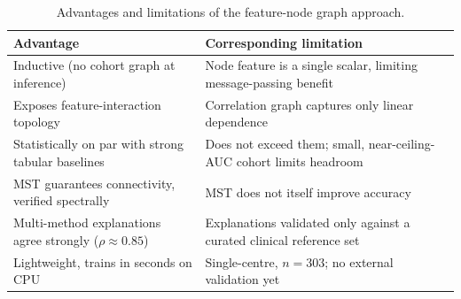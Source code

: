 \begin{table}[t]
\centering
\caption{Advantages and limitations of the feature-node graph approach.}
\label{tab:advlim}
\footnotesize
\begin{tabular}{p{4cm}p{4cm}}
\toprule
Advantage & Corresponding limitation \\
\midrule
Inductive (no cohort graph at inference) & Node feature is a single scalar, limiting message-passing benefit \\
Exposes feature-interaction topology & Correlation graph captures only linear dependence \\
Statistically on par with strong tabular baselines & Does not exceed them; small, near-ceiling-AUC cohort limits headroom \\
MST guarantees connectivity, verified spectrally & MST does not itself improve accuracy \\
Multi-method explanations agree strongly ($\rho\approx0.85$) & Explanations validated only against a curated clinical reference set \\
Lightweight, trains in seconds on CPU & Single-centre, $n=303$; no external validation yet \\
\bottomrule
\end{tabular}
\end{table}
